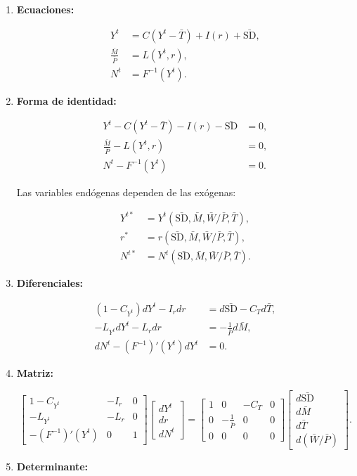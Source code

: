 \documentclass[
  doc,
  floatsintext,
  longtable,
  a4paper,
  nolmodern,
  notxfonts,
  notimes,
  12pt,
  colorlinks=true,linkcolor=blue,citecolor=blue,urlcolor=blue]{apa7}
\begin{document}
\begin{enumerate}
\def\labelenumi{\arabic{enumi}.}
\item
  \textbf{Ecuaciones:}

  \[
  \begin{aligned}
  Y^t &= C(Y^t - \bar{T}) + I(r) + \bar{\mathrm{SD}}, \\
  \frac{\bar{M}}{\bar{P}} &= L(Y^t, r), \\
  N^t &= F^{-1}(Y^t).
  \end{aligned}
  \]
\item
  \textbf{Forma de identidad:}

  \[
  \begin{aligned}
  Y^t - C(Y^t - \bar{T}) - I(r) - \bar{\mathrm{SD}} &= 0, \\
  \frac{\bar{M}}{\bar{P}} - L(Y^t, r) &= 0, \\
  N^t - F^{-1}(Y^t) &= 0.
  \end{aligned}
  \]

  Las variables endógenas dependen de las exógenas:

  \[
  \begin{aligned}
  Y^{t*} &= Y^t(\bar{\mathrm{SD}}, \bar{M}, \bar{W}/\bar{P}, \bar{T}), \\
  r^* &= r(\bar{\mathrm{SD}}, \bar{M}, \bar{W}/\bar{P}, \bar{T}), \\
  N^{t*} &= N^t(\bar{\mathrm{SD}}, \bar{M}, \bar{W}/\bar{P}, \bar{T}).
  \end{aligned}
  \]
\item
  \textbf{Diferenciales:}

  \[
  \begin{aligned}
  (1 - C_{Y^t}) dY^t - I_r dr &= d\bar{\mathrm{SD}} - C_T d\bar{T}, \\
  -L_{Y^t} dY^t - L_r dr &= -\frac{1}{\bar{P}} d\bar{M}, \\
  dN^t - (F^{-1})'(Y^t) dY^t &= 0.
  \end{aligned}
  \]
\item
  \textbf{Matriz:}

  \[
  \begin{bmatrix}
  1 - C_{Y^t} & -I_r & 0 \\
  -L_{Y^t} & -L_r & 0 \\
  -(F^{-1})'(Y^t) & 0 & 1
  \end{bmatrix}
  \begin{bmatrix}
  dY^t \\
  dr \\
  dN^t
  \end{bmatrix}
  =
  \begin{bmatrix}
  1 & 0 & -C_T & 0 \\
  0 & -\frac{1}{\bar{P}} & 0 & 0 \\
  0 & 0 & 0 & 0
  \end{bmatrix}
  \begin{bmatrix}
  d\bar{\mathrm{SD}} \\
  d\bar{M} \\
  d\bar{T} \\
  d(\bar{W}/\bar{P})
  \end{bmatrix}.
  \]
\item
  \textbf{Determinante:}


\end{enumerate}
\end{document}
